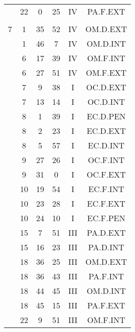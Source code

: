 \documentclass[12pt, a4paper]{article}
\begin{document}
\begin{multicols}{3}
{\begin{tabular}{c c c c c c}
	 	 	 	 & 22 & 0 & 25 & IV & PA.F.EXT\\%
	 	 	 	 & & & & & \\%
	 	 	 	7 & 1 & 35 & 52 & IV & OM.D.EXT\\%
	 	 	 	 & 1 & 46 & 7 & IV & OM.D.INT\\%
	 	 	 	 & 6 & 17 & 39 & IV & OM.F.INT\\%
	 	 	 	 & 6 & 27 & 51 & IV & OM.F.EXT\\%
	 	 	 	 & 7 & 9 & 38 & I & OC.D.EXT\\%
	 	 	 	 & 7 & 13 & 14 & I & OC.D.INT\\%
	 	 	 	 & 8 & 1 & 39 & I & EC.D.PEN\\%
	 	 	 	 & 8 & 2 & 23 & I & EC.D.EXT\\%
	 	 	 	 & 8 & 5 & 57 & I & EC.D.INT\\%
	 	 	 	 & 9 & 27 & 26 & I & OC.F.INT\\%
	 	 	 	 & 9 & 31 & 0 & I & OC.F.EXT\\%
	 	 	 	 & 10 & 19 & 54 & I & EC.F.INT\\%
	 	 	 	 & 10 & 23 & 28 & I & EC.F.EXT\\%
	 	 	 	 & 10 & 24 & 10 & I & EC.F.PEN\\%
	 	 	 	 & 15 & 7 & 51 & III & PA.D.EXT\\%
	 	 	 	 & 15 & 16 & 23 & III & PA.D.INT\\%
	 	 	 	 & 18 & 36 & 25 & III & OM.D.EXT\\%
	 	 	 	 & 18 & 36 & 43 & III & PA.F.INT\\%
	 	 	 	 & 18 & 44 & 45 & III & OM.D.INT\\%
	 	 	 	 & 18 & 45 & 15 & III & PA.F.EXT\\%
	 	 	 	 & 22 & 9 & 51 & III & OM.F.INT\\%

\end{tabular}}
\end{multicols}
\end{document}
